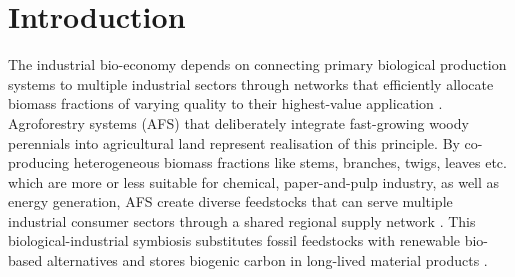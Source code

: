\documentclass[APA,TimesLARGE]{WileyNJDv5} %
\begin{document}

\maketitle


\section{Introduction}\label{introduction}

The industrial bio-economy depends on connecting primary biological production systems to multiple industrial sectors through networks that efficiently allocate biomass fractions of varying quality to their highest-value application \cite{Hildebrandt2019}. Agroforestry systems (AFS) that deliberately integrate fast-growing woody perennials into agricultural land represent realisation of this principle. By co-producing heterogeneous biomass fractions like stems, branches, twigs, leaves etc. which are more or less suitable for chemical, paper-and-pulp industry, as well as energy generation, AFS create diverse feedstocks that can serve multiple industrial consumer sectors through a shared regional supply network \cite{Toensmeier2017_Carbon_Agroforestry}. This biological-industrial symbiosis substitutes fossil feedstocks with renewable bio-based alternatives and stores biogenic carbon in long-lived material products \cite{Millard2011}.
\end{document}
